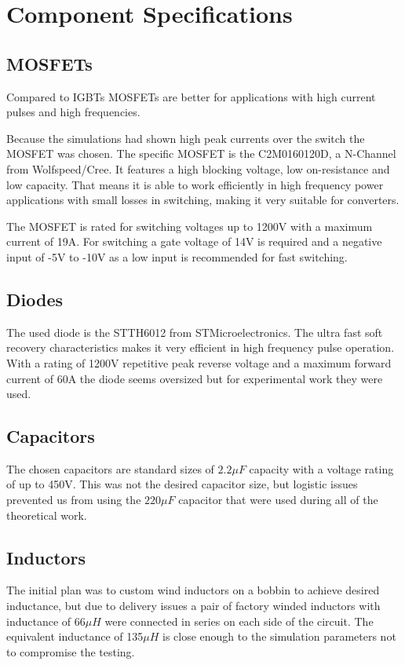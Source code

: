 \vspace{-8mm}
\section{Component Specifications}\label{ch:compSpec}
\vspace{-2mm}
\subsection{MOSFETs}
\vspace{-2mm}
Compared to IGBTs MOSFETs are better for applications with high current pulses and high frequencies.\cite{igbtelec63:online}

Because the simulations had shown high peak currents over the switch the MOSFET was chosen.
The specific MOSFET is the C2M0160120D, a N-Channel from Wolfspeed/Cree. 
It features a high blocking voltage, low on-resistance and low capacity.
That means it is able to work efficiently in high frequency power applications with small losses in switching, making it very suitable for converters.

The MOSFET is rated for switching voltages up to 1200V with a maximum current of 19A.
For switching a gate voltage of 14V is required and a negative input of -5V to -10V as a low input is recommended for fast switching.\cite{CreeC2M082:online}
\vspace{-4mm}
\subsection{Diodes}
\vspace{-2mm}
The used diode is the STTH6012 from STMicroelectronics.
The ultra fast soft recovery characteristics makes it very efficient in high frequency pulse operation.
With a rating of 1200V repetitive peak reverse voltage and a maximum forward current of 60A the diode seems oversized but for experimental work they were used.\cite{ST}
\vspace{-4mm}
\subsection{Capacitors}
\vspace{-2mm}
The chosen capacitors are standard sizes of $2.2 \mu F$ capacity with a voltage rating of up to 450V. This was not the desired capacitor size, but logistic issues prevented us from using the $220 \mu F$ capacitor that were used during all of the theoretical work.
\vspace{-4mm}
\subsection{Inductors}
The initial plan was to custom wind inductors on a bobbin to achieve desired inductance, but due to delivery issues a pair of factory winded inductors with inductance of 66$\mu H$ were connected in series on each side of the circuit.
The equivalent inductance of 135$\mu H$ is close enough to the simulation parameters not to compromise the testing.